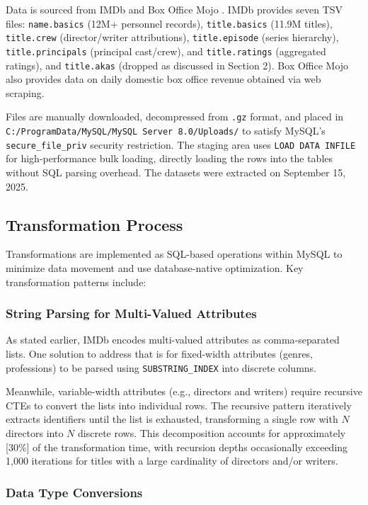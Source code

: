 Data is sourced from IMDb \cite{imdb2025datasets} and Box Office Mojo \cite{boxofficemojo2025}. IMDb provides seven TSV files: \texttt{name.basics} (12M+ personnel records), \texttt{title.basics} (11.9M titles), \texttt{title.crew} (director/writer attributions), \texttt{title.episode} (series hierarchy), \texttt{title.principals} (principal cast/crew), and \texttt{title.ratings} (aggregated ratings), and \texttt{title.akas} (dropped as discussed in Section 2). Box Office Mojo also provides data on daily domestic box office revenue obtained via web scraping.

Files are manually downloaded, decompressed from \texttt{.gz} format, and placed in \texttt{C:/ProgramData/MySQL/MySQL Server 8.0/Uploads/} to satisfy MySQL's \texttt{secure\_file\_priv} security restriction. The staging area uses \texttt{LOAD DATA INFILE} for high-performance bulk loading, directly loading the rows into the tables without SQL parsing overhead. The datasets were extracted on September 15, 2025.

\subsection{Transformation Process}

Transformations are implemented as SQL-based operations within MySQL to minimize data movement and use database-native optimization. Key transformation patterns include:

\subsubsection{String Parsing for Multi-Valued Attributes}

As stated earlier, IMDb encodes multi-valued attributes as comma-separated lists. One solution to address that is for fixed-width attributes (genres, professions) to be parsed using \texttt{SUBSTRING\_INDEX} into discrete columns.

Meanwhile, variable-width attributes (e.g., directors and writers) require recursive CTEs to convert the lists into individual rows. The recursive pattern iteratively extracts identifiers until the list is exhausted, transforming a single row with $N$ directors into $N$ discrete rows. This decomposition accounts for approximately [30\%] of the transformation time, with recursion depths occasionally exceeding 1,000 iterations for titles with a large cardinality of directors and/or writers.

\subsubsection{Data Type Conversions}

